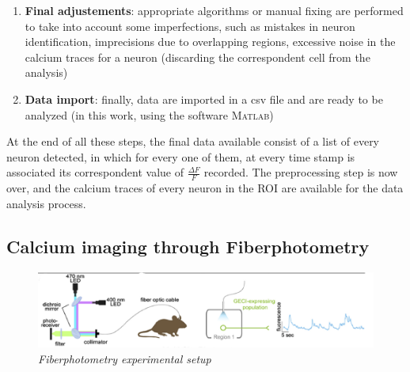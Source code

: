 \documentclass[a4paper]{article}
\begin{document}
\begin{enumerate}
	\item \textbf{Final adjustements}: appropriate algorithms or manual fixing are performed to take into account some imperfections, such as mistakes in neuron identification, imprecisions due to overlapping regions, excessive noise in the calcium traces for a neuron (discarding the correspondent cell from the analysis)
	
	\item \textbf{Data import}: finally, data are imported in a csv file and are ready to be analyzed (in this work, using the software \textsc{Matlab})
	
\end{enumerate} 


At the end of all these steps, the final data available consist of a list of every neuron detected, in which for every one of them, at every time stamp is associated its correspondent value of $\frac{\Delta F }{F}$ recorded. The preprocessing step is now over, and the calcium traces of every neuron in the ROI are available for the data analysis process.	


\newpage
\subsection{Calcium imaging through Fiberphotometry}

\begin{figure}[H]
	\begin{center}
		\includegraphics[scale=.50]{fiberphotometry.png} 
	\end{center} 
	\caption{\textit{Fiberphotometry experimental setup}}
	
\end{figure}
\end{document}
